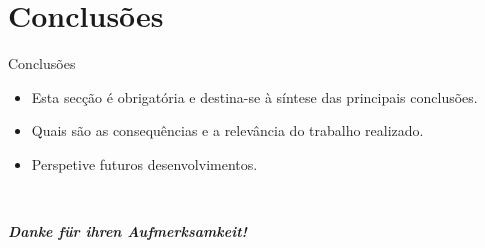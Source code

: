 \documentclass[
aspectratio=169,	%
LETI,				%
english,			%
]{DEEclassP}
\begin{document}
\section{Conclusões}

\begin{frame}{Conclusões}

\setlstep{0.5cm}{0cm}{0cm}
\begin{itemize}
	\item Esta secção é obrigatória e destina-se à síntese das principais conclusões.

	\item Quais são as consequências e a relevância do trabalho realizado.

	\item Perspetive futuros desenvolvimentos. 
\end{itemize}
	
\end{frame}


\begin{frame}{~}
  \transboxin	%
  \centering
  \Large %
  

\textit{\textbf{Danke für ihren Aufmerksamkeit!}}
\end{frame}





		

\end{document}
